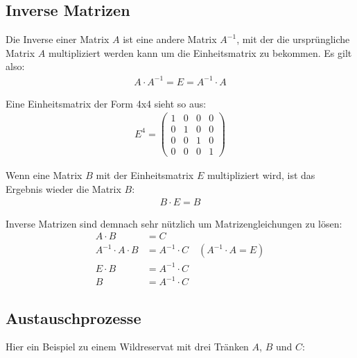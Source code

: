 \subsection{Inverse Matrizen}
\begin{flushleft}
Die Inverse einer Matrix $A$ ist eine andere Matrix $A^{-1}$, mit der die ursprüngliche Matrix $A$ multipliziert werden kann um die Einheitsmatrix zu bekommen.
Es gilt also:
\begin{align}
    A \cdot A^{-1}=E=A^{-1} \cdot A
\end{align}

Eine Einheitsmatrix der Form 4x4 sieht so aus:
\begin{align}
    E^4=\begin{pmatrix}
        1 & 0 & 0 & 0 \\
        0 & 1 & 0 & 0 \\
        0 & 0 & 1 & 0 \\
        0 & 0 & 0 & 1
    \end{pmatrix}
\end{align}

Wenn eine Matrix $B$ mit der Einheitsmatrix $E$ multipliziert wird, ist das Ergebnis wieder die Matrix $B$:
\begin{align}
    B \cdot E=B
\end{align}

Inverse Matrizen sind demnach sehr nützlich um Matrizengleichungen zu lösen:
\begin{align}
    A \cdot B&=C \\
    A^{-1} \cdot A \cdot B&=A^{-1} \cdot C
    \quad (A^{-1} \cdot A=E) \\
    E \cdot B&=A^{-1} \cdot C \\
    B&=A^{-1} \cdot C
\end{align}
\end{flushleft}

\subsection{Austauschprozesse}
\begin{flushleft}
Hier ein Beispiel zu einem Wildreservat mit drei Tränken $A$, $B$ und $C$:
\end{flushleft}

